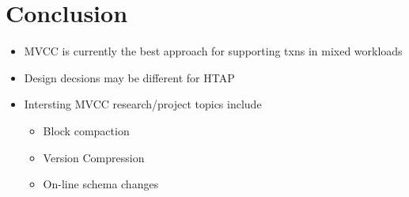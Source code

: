 \documentclass[11pt]{article}
\begin{document}
\section{Conclusion}
\begin{itemize}
    \item MVCC is currently the best approach for supporting txns in mixed workloads
    \item Design decsions may be different for HTAP
    \item Intersting MVCC research/project topics include
    \begin{itemize}
        \item Block compaction
        \item Version Compression
        \item On-line schema changes
    \end{itemize}
\end{itemize}

\newpage


\end{document}

